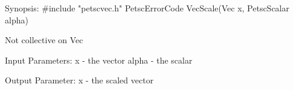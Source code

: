 Synopsis:
#include "petscvec.h"
PetscErrorCode VecScale(Vec x, PetscScalar alpha)

Not collective on Vec

Input Parameters:
x     - the vector
alpha - the scalar

Output Parameter:
x - the scaled vector
